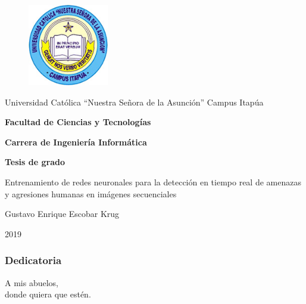 \documentclass[a4paper,12pt,oneside,spanish]{book}
\begin{document}
\thispagestyle{empty}
\begin{figure}[h!]
	\includegraphics[width=100pt]{Imagenes/logo.png}
	\centering
\end{figure}
\vspace*{0.1cm}
\begin{center}
	{\LARGE {Universidad Católica ``Nuestra Señora de la Asunción'' Campus Itapúa}}
\end{center}
\vspace*{0.1cm}
\begin{center}
	{\large \rm \textbf {Facultad de Ciencias y Tecnologías}}
\end{center}
\vspace*{0.1cm}
\begin{center}
	{\large \rm \textbf {Carrera de Ingeniería Informática}}
\end{center}	
\vspace*{0.2cm}
\begin{center}
	{\large \rm \textbf {Tesis de grado}}
\end{center}
	
\baselineskip 30pt
\vspace*{1cm}
\begin{center}
	{\large \rm Entrenamiento de redes neuronales para la detección en tiempo real de amenazas y agresiones humanas en imágenes secuenciales}
\end{center}

\vspace*{1cm}

\begin{center}
	{\sc  Gustavo Enrique Escobar Krug\\}
	\vspace*{0.1cm}
	
\end{center}
\vspace*{2cm}
\begin{center}
	{\large \rm 2019}
\end{center}




\newpage
\clearpage
\thispagestyle{fancy}
\setcounter{page}{1}
\setlength{\parskip}{1.3em}
\begin{flushright}
	\subsubsection{Dedicatoria}
	A mis abuelos, \\
	donde quiera que estén.
\end{flushright}
\end{document}
